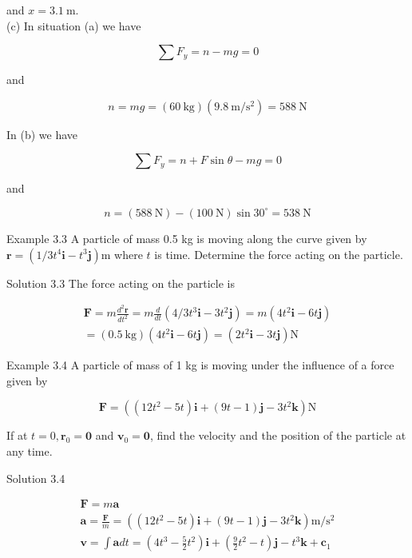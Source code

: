 \documentclass[10pt]{article}
\numberwithin{equation}{section}
\begin{document}
and $x=3.1 \mathrm{~m}$.\\
(c) In situation (a) we have

$$
\sum F_{y}=n-m g=0
$$

and

$$
n=m g=(60 \mathrm{~kg})\left(9.8 \mathrm{~m} / \mathrm{s}^{2}\right)=588 \mathrm{~N}
$$

In (b) we have

$$
\sum F_{y}=n+F \sin \theta-m g=0
$$

and

$$
n=(588 \mathrm{~N})-(100 \mathrm{~N}) \sin 30^{\circ}=538 \mathrm{~N}
$$

Example 3.3 A particle of mass 0.5 kg is moving along the curve given by $\mathbf{r}=\left(1 / 3 t^{4} \mathbf{i}-t^{3} \mathbf{j}\right) \mathrm{m}$ where $t$ is time. Determine the force acting on the particle.

Solution 3.3 The force acting on the particle is

$$
\begin{gathered}
\mathbf{F}=m \frac{d^{2} \mathbf{r}}{d t^{2}}=m \frac{d}{d t}\left(4 / 3 t^{3} \mathbf{i}-3 t^{2} \mathbf{j}\right)=m\left(4 t^{2} \mathbf{i}-6 t \mathbf{j}\right) \\
=(0.5 \mathrm{~kg})\left(4 t^{2} \mathbf{i}-6 t \mathbf{j}\right)=\left(2 t^{2} \mathbf{i}-3 t \mathbf{j}\right) \mathrm{N}
\end{gathered}
$$

Example 3.4 A particle of mass of 1 kg is moving under the influence of a force given by

$$
\mathbf{F}=\left(\left(12 t^{2}-5 t\right) \mathbf{i}+(9 t-1) \mathbf{j}-3 t^{2} \mathbf{k}\right) \mathrm{N}
$$

If at $t=0, \mathbf{r}_{0}=\mathbf{0}$ and $\mathbf{v}_{0}=\mathbf{0}$, find the velocity and the position of the particle at any time.

Solution 3.4

$$
\begin{gathered}
\mathbf{F}=m \mathbf{a} \\
\mathbf{a}=\frac{\mathbf{F}}{m}=\left(\left(12 t^{2}-5 t\right) \mathbf{i}+(9 t-1) \mathbf{j}-3 t^{2} \mathbf{k}\right) \mathrm{m} / \mathrm{s}^{2} \\
\mathbf{v}=\int \mathbf{a} d t=\left(4 t^{3}-\frac{5}{2} t^{2}\right) \mathbf{i}+\left(\frac{9}{2} t^{2}-t\right) \mathbf{j}-t^{3} \mathbf{k}+\mathbf{c}_{1}
\end{gathered}
$$
\end{document}
